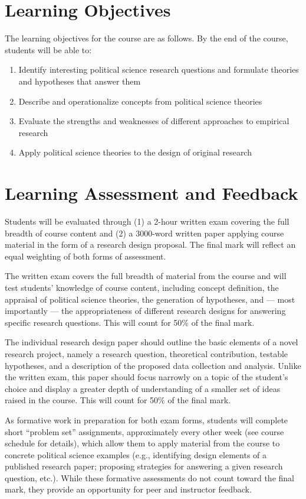 \documentclass[12pt,a4paper]{article}
\begin{document}
\section{Learning Objectives}
The learning objectives for the course are as follows. By the end of the course, students will be able to:

\begin{enumerate}
\item Identify interesting political science research questions and formulate theories and hypotheses that answer them
\item Describe and operationalize concepts from political science theories
\item Evaluate the strengths and weaknesses of different approaches to empirical research
\item Apply political science theories to the design of original research
\end{enumerate}

\section{Learning Assessment and Feedback}

Students will be evaluated through (1) a 2-hour written exam covering the full breadth of course content and (2) a 3000-word written paper applying course material in the form of a research design proposal. The final mark will reflect an equal weighting of both forms of assessment.

The written exam covers the full breadth of material from the course and will test students' knowledge of course content, including concept definition, the appraisal of political science theories, the generation of hypotheses, and --- most importantly --- the appropriateness of different research designs for answering specific research questions. This will count for 50\% of the final mark.

The individual research design paper should outline the basic elements of a novel research project, namely a research question, theoretical contribution, testable hypotheses, and a description of the proposed data collection and analysis. Unlike the written exam, this paper should focus narrowly on a topic of the student's choice and display a greater depth of understanding of a smaller set of ideas raised in the course. This will count for 50\% of the final mark.

As formative work in preparation for both exam forms, students will complete short ``problem set'' assignments, approximately every other week (see course schedule for details), which allow them to apply material from the course to concrete political science examples (e.g., identifying design elements of a published research paper; proposing strategies for answering a given research question, etc.). While these formative assessments do not count toward the final mark, they provide an opportunity for peer and instructor feedback.
\end{document}
